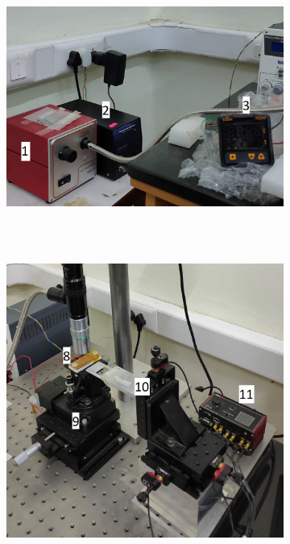 \begin{figure}[H]
	\centering
	\begin{minipage}{.45\linewidth}
		\begin{subfigure}[t]{0.9\textwidth}
			\centering
			\includegraphics[width=\textwidth]{figures/trset1.jpg}
		\end{subfigure}
		\\
		\\
		\begin{subfigure}[b]{0.9\textwidth}
			\centering
			\includegraphics[width=\textwidth]{figures/trset3.jpg}

\end{subfigure}
\end{minipage}
\end{figure}
